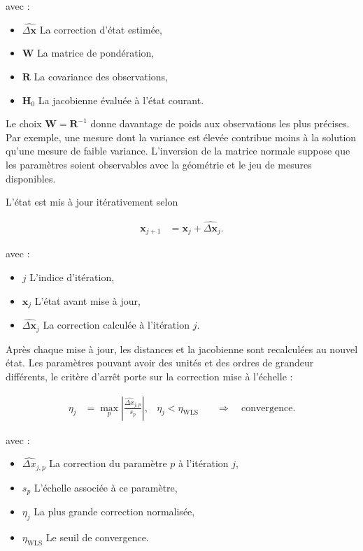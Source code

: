 avec :

\begin{itemize}
    \item $\widehat{\Delta\mathbf x}$ La correction d'état estimée,
    \item $\mathbf W$ La matrice de pondération,
    \item $\mathbf R$ La covariance des observations,
    \item $\mathbf H_0$ La jacobienne évaluée à l'état courant.
\end{itemize}

Le choix $\mathbf W=\mathbf R^{-1}$ donne davantage de poids aux observations
les plus précises. Par exemple, une mesure dont la variance est élevée contribue
moins à la solution qu'une mesure de faible variance. L'inversion de la matrice
normale suppose que les paramètres soient observables avec la géométrie et le
jeu de mesures disponibles.

L'état est mis à jour itérativement selon

\begin{align}
\mathbf x_{j+1}
&=
\mathbf x_j+\widehat{\Delta\mathbf x}_j.
\label{ann:eq:wls_iteration}
\end{align}

avec :

\begin{itemize}
    \item $j$ L'indice d'itération,
    \item $\mathbf x_j$ L'état avant mise à jour,
    \item $\widehat{\Delta\mathbf x}_j$ La correction calculée à l'itération
    $j$.
\end{itemize}

Après chaque mise à jour, les distances et la jacobienne sont recalculées au
nouvel état. Les paramètres pouvant avoir des unités et des ordres de grandeur
différents, le critère d'arrêt porte sur la correction mise à l'échelle :

\begin{align}
\eta_j
&=
\max_p\left|
\frac{\widehat{\Delta x}_{j,p}}{s_p}
\right|,
&
\eta_j<\eta_{\mathrm{WLS}}
&\quad\Longrightarrow\quad
\text{convergence}.
\label{ann:eq:wls_stopping_criterion}
\end{align}

avec :

\begin{itemize}
    \item $\widehat{\Delta x}_{j,p}$ La correction du paramètre $p$ à
    l'itération $j$,
    \item $s_p$ L'échelle associée à ce paramètre,
    \item $\eta_j$ La plus grande correction normalisée,
    \item $\eta_{\mathrm{WLS}}$ Le seuil de convergence.
\end{itemize}

